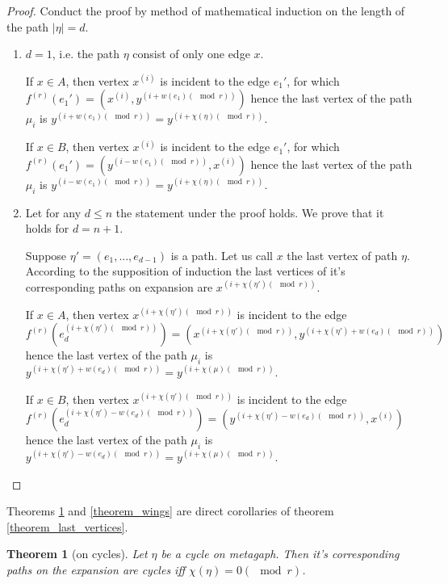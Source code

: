 \documentclass[14pt]{mmcs-article}
\newtheorem{theorem}{Theorem}
\begin{document}
\begin{proof}
    Conduct the proof by method of mathematical induction on the length of the path $|\eta| = d$.
    
    \begin{enumerate}
    \item $d = 1$, i.e. the path $\eta$ consist of only one edge $x$.
    
    If $x \in A$, then vertex $x^{(i)}$ is incident to the edge $e_1'$, for which $f^{(r)}(e_1') = (x^{(i)}, y^{(i + w(e_1) (\mod{r}))})$ hence the last vertex of the path $\mu_i$ is $y^{(i + w(e_1) (\mod{r}))} = y^{(i + \chi(\eta) (\mod{r}))}$.
    
    If $x \in B$, then vertex $x^{(i)}$ is incident to the edge $e_1'$, for which $f^{(r)}(e_1') = (y^{(i - w(e_1) (\mod{r}))}, x^{(i)})$ hence the last vertex of the path $\mu_i$ is $y^{(i - w(e_1) (\mod{r}))} = y^{(i + \chi(\eta) (\mod{r}))}$.
    
    \item Let for any $d \leq n$ the statement under the proof holds. We prove that it holds for $d = n + 1$.

    Suppose $\eta' = (e_1, ..., e_{d - 1})$ is a path. Let us call $x$ the last vertex of path $\eta$. According to the supposition of induction the last vertices of it's corresponding paths on expansion are $x^{(i + \chi(\eta')(\mod{r}))}$.
    
    If $x \in A$, then vertex $x^{(i + \chi(\eta')(\mod{r}))}$ is incident to the edge $f^{(r)}(e_d^{(i + \chi(\eta')(\mod{r}))}) = (x^{(i + \chi(\eta')(\mod{r}))}, y^{(i + \chi(\eta') + w(e_d) (\mod{r}))})$ hence the last vertex of the path $\mu_i$ is $y^{(i + \chi(\eta') + w(e_d) (\mod{r}))} = y^{(i + \chi(\mu) (\mod{r}))}$.
    
    If $x \in B$, then vertex $x^{(i + \chi(\eta')(\mod{r}))}$ is incident to the edge $f^{(r)}(e_d^{(i + \chi(\eta') - w(e_d) (\mod{r}))}) = (y^{(i + \chi(\eta') - w(e_d) (\mod{r}))}, x^{(i)})$ hence the last vertex of the path $\mu_i$ is $y^{(i + \chi(\eta') - w(e_d) (\mod{r}))} = y^{(i + \chi(\mu) (\mod{r}))}$.  
    
    \end{enumerate}  
\end{proof}

Theorems \ref{theorem_cycles} and \ref{theorem_wings} are direct corollaries of theorem \ref{theorem_last_vertices}.

\begin{theorem}[on cycles]\label{theorem_cycles}
    Let $\eta$ be a cycle on metagaph. Then it's corresponding paths on the expansion are cycles iff $\chi(\eta) = 0 (\mod{r})$.
\end{theorem}
\end{document}
